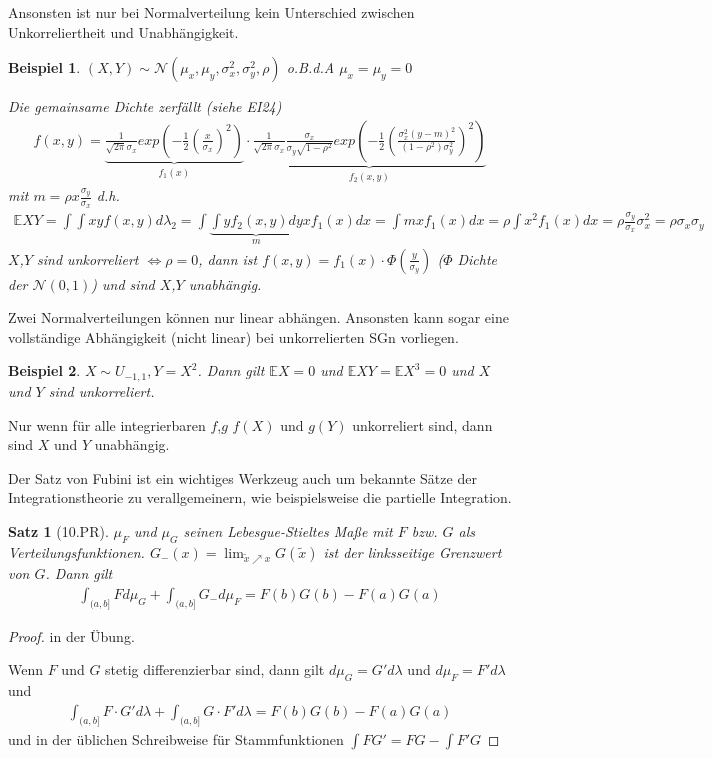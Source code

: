 \documentclass[]{article}
\newtheorem{theorem}{Satz}
\newtheorem*{example}{Beispiel}
\begin{document}
Ansonsten ist nur bei Normalverteilung kein Unterschied zwischen Unkorreliertheit und Unabhängigkeit.

\begin{example}
	$(X,Y)\sim \mathcal{N}(\mu_x,\mu_y,\sigma_x^2,\sigma_y^2,\rho)$ o.B.d.A $\mu_x=\mu_y = 0$
	
	Die gemainsame Dichte zerfällt (siehe EI24)
	\begin{align*}
		f(x,y) = \underbrace{\frac{1}{\sqrt{2\pi}\sigma_x} exp\left(-\frac{1}{2}\left(\frac{x}{\sigma_x}\right)^2\right)}_{f_1(x)} \cdot \underbrace{\frac{1}{\sqrt{2\pi}\sigma_x} \frac{\sigma_x}{\sigma_y\sqrt{1-\rho^2}} exp\left(-\frac{1}{2}\left(\frac{\sigma_x^2(y-m)^2}{(1-\rho^2)\sigma_y^2}\right)^2\right)}_{f_2(x,y)}
	\end{align*}
	mit $m=\rho x \frac{\sigma_y}{\sigma_x}$ d.h.
	\begin{align*}
		\mathbb{E}XY = \int\int xyf(x,y)d\lambda_2 = \int\underbrace{\int y f_2(x,y) dy}_m xf_1(x) dx = \int m x f_1(x) dx = \rho \int x^2 f_1(x) dx = \rho \frac{\sigma_y}{\sigma_x}\sigma_x^2 = \rho\sigma_x\sigma_y
	\end{align*}
	$X$,$Y$ sind unkorreliert $\iff \rho = 0$, dann ist $f(x,y) = f_1(x)\cdot \Phi(\frac{y}{\sigma_y})$ ($\Phi$ Dichte der $\mathcal{N}(0,1)$) und sind $X$,$Y$ unabhängig.
\end{example}

Zwei Normalverteilungen können nur linear abhängen. Ansonsten kann sogar eine vollständige Abhängigkeit (nicht linear) bei unkorrelierten SGn vorliegen.

\begin{example}
	$X\sim U_{-1,1}, Y = X^2$. Dann gilt $\mathbb{E}X=0$ und $\mathbb{E}XY = \mathbb{E}X^3 = 0$ und $X$ und $Y$ sind unkorreliert.
\end{example}

Nur wenn für alle integrierbaren $f$,$g$ $f(X)$ und $g(Y)$ unkorreliert sind, dann sind $X$ und $Y$ unabhängig.

Der Satz von Fubini ist ein wichtiges Werkzeug auch um bekannte Sätze der Integrationstheorie zu verallgemeinern, wie beispielsweise die partielle Integration.

\begin{theorem}[10.PR]
	$\mu_F$ und $\mu_G$ seinen Lebesgue-Stieltes Maße mit $F$ bzw. $G$ als Verteilungsfunktionen. $G_-(x)=\lim_{\tilde{x}\nearrow x}G(\tilde{x})$ ist der linksseitige Grenzwert von $G$. Dann gilt
	\begin{align*}
		\int_{(a,b]}Fd\mu_G + \int_{(a,b]}G_-d\mu_F = F(b)G(b)-F(a)G(a)
	\end{align*}
\end{theorem}
\begin{proof}
	in der Übung.
	
	Wenn $F$ und $G$ stetig differenzierbar sind, dann gilt $d\mu_G = G'd\lambda$ und $d\mu_F = F'd\lambda$ und
	\begin{align*}
		\int_{(a,b]} F\cdot G' d\lambda + \int_{(a,b]} G\cdot F' d\lambda = F(b)G(b)-F(a)G(a)
	\end{align*}
	und in der üblichen Schreibweise für Stammfunktionen $\int FG' = FG - \int F'G$
\end{proof}
\end{document}
